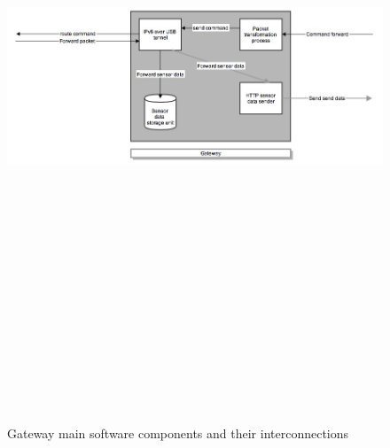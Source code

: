 \documentclass[12pt,a4paper,final]{report}
\begin{document}
\begin{figure}[htbp]
\centering
\includegraphics[width=17cm,height=20cm,keepaspectratio]{img/part2.jpg}
\caption{Gateway main software components and their interconnections}
\label{fig:part2}
\end{figure}
\end{document}
